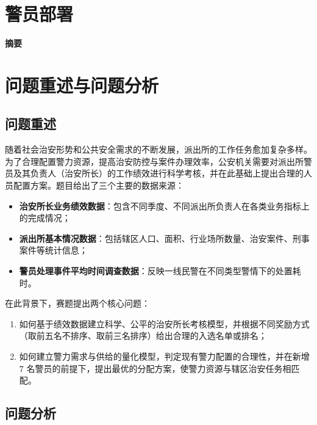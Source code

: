 \documentclass[12pt]{ctexart}
\begin{document}
	\section*{警员部署}
	
	\begin{center}
		\Large\textbf{摘要}
	\end{center}
	
	\newpage
	
	\section{问题重述与问题分析}
	
	\subsection{问题重述}
	
	随着社会治安形势和公共安全需求的不断发展，派出所的工作任务愈加复杂多样。为了合理配置警力资源，提高治安防控与案件办理效率，公安机关需要对派出所警员及其负责人（治安所长）的工作绩效进行科学考核，并在此基础上提出合理的人员配置方案。题目给出了三个主要的数据来源：
	
	\begin{itemize}
		\item \textbf{治安所长业务绩效数据}：包含不同季度、不同派出所负责人在各类业务指标上的完成情况；
		\item \textbf{派出所基本情况数据}：包括辖区人口、面积、行业场所数量、治安案件、刑事案件等统计信息；
		\item \textbf{警员处理事件平均时间调查数据}：反映一线民警在不同类型警情下的处置耗时。
	\end{itemize}
	
	在此背景下，赛题提出两个核心问题：
	\begin{enumerate}
		\item 如何基于绩效数据建立科学、公平的治安所长考核模型，并根据不同奖励方式（取前五名不排序、取前三名排序）给出合理的入选名单或排名；
		\item 如何建立警力需求与供给的量化模型，判定现有警力配置的合理性，并在新增 $7$ 名警员的前提下，提出最优的分配方案，使警力资源与辖区治安任务相匹配。
	\end{enumerate}
	
	\subsection{问题分析}
	
\end{document}
